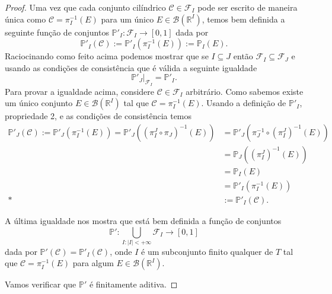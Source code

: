 \begin{proof}
Uma vez que cada conjunto cilíndrico $\mathcal{C}\in \mathcal{F}_{I}$
pode ser escrito de maneira única como $\mathcal{C} = \pi_{I}^{-1}(E)$
para um único $E\in\mathscr{B}(\mathbb{R}^I)$, temos bem definida 
a seguinte função de conjuntos $\mathbb{P}'_{I}:\mathcal{F}_{I}\to [0,1]$ 
dada por 
\[
\mathbb{P}'_{I}(\mathcal{C})
:= 
\mathbb{P}'_{I}(\pi_{I}^{-1}(E)) 
:= 
\mathbb{P}_{I}(E).
\]
Raciocinando como feito acima podemos mostrar que
se $I\subseteq J$ então $\mathcal{F}_{I}\subseteq \mathcal{F}_{J}$ e
usando as condições de consistência que é válida a seguinte igualdade 
\[
\mathbb{P}'_{J}\big|_{\mathcal{F}_{I}} = \mathbb{P}'_{I}.
\]
Para provar a igualdade acima, considere $\mathcal{C}\in\mathcal{F}_{I}$
arbitrário. Como sabemos existe um único conjunto 
$E\in \mathscr{B}(\mathbb{R}^I)$ tal que $\mathcal{C} = \pi_{I}^{-1}(E)$.
Usando a definição de $\mathbb{P}'_{I}$, propriedade 2, e as condições 
de consistência temos 
\begin{align*}
\mathbb{P}'_{J}(\mathcal{C})
:=
\mathbb{P}'_{J}(\pi_{I}^{-1}(E))
=
\mathbb{P}'_{J}(  (\pi_{I}^{J}\circ \pi_{J})  ^{-1}(E))
&=
\mathbb{P}'_{J}( \pi^{-1}_{J}\circ (\pi_{I}^{J})^{-1}(E))
\\
&=
\mathbb{P}_{J}( (\pi_{I}^{J})^{-1}(E))
\\
&=
\mathbb{P}_{I}(E)
\\
&=
\mathbb{P}'_{I}( \pi^{-1}_{I}(E))
\\*
&:=
\mathbb{P}'_{I}(\mathcal{C}).
\end{align*}



A última igualdade nos mostra que está bem definida a função 
de conjuntos 
\[ 
\mathbb{P}': \!\!\!\!
\bigcup_{I:|I|<+\infty}\!\!\!\! \mathcal{F}_{I}\to [0,1]
\]
dada por $\mathbb{P}'(\mathcal{C}) = \mathbb{P}'_{I}(\mathcal{C})$,
onde $I$ é um subconjunto finito qualquer de $T$ tal que 
$\mathcal{C}=\pi_{I}^{-1}(E)$ para algum $E\in \mathscr{B}(\mathbb{R}^I)$.


Vamos verificar que $\mathbb{P}'$ é finitamente aditiva.
\end{proof}